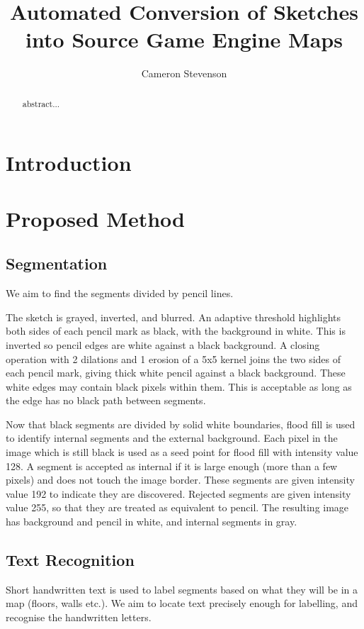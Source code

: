 \documentclass{IEEEtran}
\begin{document}
\title{Automated Conversion of Sketches into Source Game Engine Maps}
\author{Cameron Stevenson}
 
\begin{abstract}
abstract...
\end{abstract}

\maketitle

\section{Introduction}

\section{Proposed Method}
\subsection{Segmentation}
We aim to find the segments divided by pencil lines.

The sketch is grayed, inverted, and blurred. An adaptive threshold highlights both sides of each pencil mark as black, with the background in white. This is inverted so pencil edges are white against a black background. A closing operation with 2 dilations and 1 erosion of a 5x5 kernel joins the two sides of each pencil mark, giving thick white pencil against a black background. These white edges may contain black pixels within them. This is acceptable as long as the edge has no black path between segments.

Now that black segments are divided by solid white boundaries, flood fill is used to identify internal segments and the external background. Each pixel in the image which is still black is used as a seed point for flood fill with intensity value 128. A segment is accepted as internal if it is large enough (more than a few pixels) and does not touch the image border. These segments are given intensity value 192 to indicate they are discovered. Rejected segments are given intensity value 255, so that they are treated as equivalent to pencil. The resulting image has background and pencil in white, and internal segments in gray.

\subsection{Text Recognition}
Short handwritten text is used to label segments based on what they will be in a map (floors, walls etc.). We aim to locate text precisely enough for labelling, and recognise the handwritten letters. 
\end{document}
